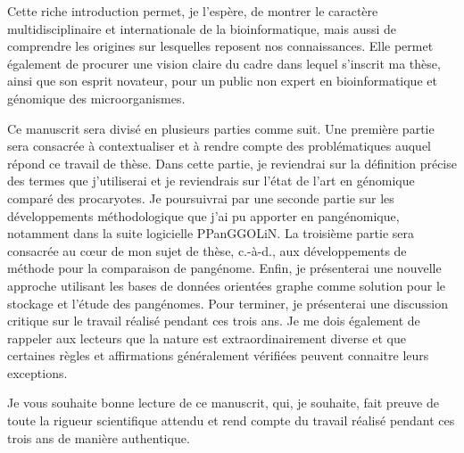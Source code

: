 Cette riche introduction permet, je l'espère, de montrer le caractère multidisciplinaire et internationale de la bioinformatique, mais aussi de comprendre les origines sur lesquelles reposent nos connaissances. Elle permet également de procurer une vision claire du cadre dans lequel s'inscrit ma thèse, ainsi que son esprit novateur, pour un public non expert en bioinformatique et génomique des microorganismes.
\newline

Ce manuscrit sera divisé en plusieurs parties comme suit. Une première partie sera consacrée à contextualiser et à rendre compte des problématiques auquel répond ce travail de thèse. Dans cette partie, je reviendrai sur la définition précise des termes que j'utiliserai et je reviendrais sur l'état de l'art en génomique comparé des procaryotes. Je poursuivrai par une seconde partie sur les développements méthodologique que j'ai pu apporter en pangénomique, notamment dans la suite logicielle PPanGGOLiN. La troisième partie sera consacrée au c{\oe}ur de mon sujet de thèse, c.-à-d., aux développements de méthode pour la comparaison de pangénome. Enfin, je présenterai une nouvelle approche utilisant les bases de données orientées graphe comme solution pour le stockage et l'étude des pangénomes. Pour terminer, je présenterai une discussion critique sur le travail réalisé pendant ces trois ans. Je me dois également de rappeler aux lecteurs que la nature est extraordinairement diverse et que certaines règles et affirmations généralement vérifiées peuvent connaitre leurs exceptions.
\newline

Je vous souhaite bonne lecture de ce manuscrit, qui, je souhaite, fait preuve de toute la rigueur scientifique attendu et rend compte du travail réalisé pendant ces trois ans de manière authentique.
